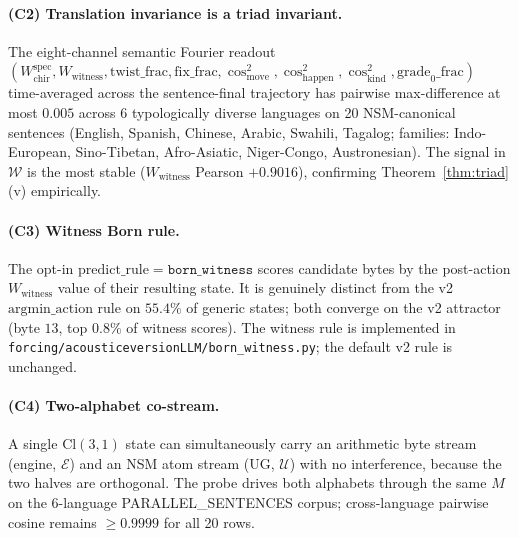 \documentclass[11pt,a4paper]{article}
\theoremstyle{plain}
\theoremstyle{definition}
\theoremstyle{remark}
\numberwithin{equation}{section}
\providecommand{\Cl}{\mathrm{Cl}}
\begin{document}
\paragraph{(C2) Translation invariance is a triad invariant.}
The eight-channel semantic Fourier readout
$(W_{\mathrm{chir}}^{\mathrm{spec}}, W_{\mathrm{witness}},
\mathrm{twist\_frac}, \mathrm{fix\_frac}, \cos^2_{\mathrm{move}},
\cos^2_{\mathrm{happen}}, \cos^2_{\mathrm{kind}},
\mathrm{grade}_0\!\mathrm{\_frac})$ time-averaged across the
sentence-final trajectory has pairwise max-difference at most
$0.005$ across 6 typologically diverse languages on 20 NSM-canonical
sentences (English, Spanish, Chinese, Arabic, Swahili, Tagalog;
families: Indo-European, Sino-Tibetan, Afro-Asiatic, Niger-Congo,
Austronesian).  The signal in $\mathcal{W}$ is the most stable
($W_{\mathrm{witness}}$ Pearson $+0.9016$), confirming
Theorem~\ref{thm:triad}(v) empirically.

\paragraph{(C3) Witness Born rule.}
The opt-in $\mathrm{predict\_rule}=\texttt{born\_witness}$ scores
candidate bytes by the post-action $W_{\mathrm{witness}}$ value of
their resulting state.  It is genuinely distinct from the v2
$\mathrm{argmin\_action}$ rule on $55.4\%$ of generic states;
both converge on the v2 attractor (byte $13$, top $0.8\%$ of
witness scores).  The witness rule is implemented in
\texttt{forcing/acousticeversionLLM/born\_witness.py}; the default
v2 rule is unchanged.

\paragraph{(C4) Two-alphabet co-stream.}
A single $\Cl(3,1)$ state can simultaneously carry an arithmetic
byte stream (engine, $\mathcal{E}$) and an NSM atom stream (UG,
$\mathcal{U}$) with no interference, because the two halves are
orthogonal.  The probe drives both alphabets through the same $M$
on the 6-language PARALLEL\_SENTENCES corpus; cross-language
pairwise cosine remains $\geq 0.9999$ for all 20 rows.
\end{document}
